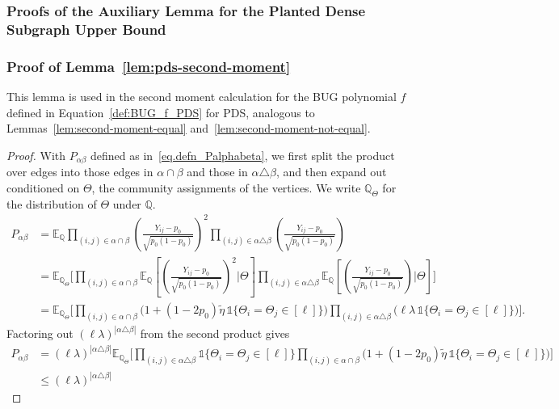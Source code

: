 \documentclass[11pt, letterpaper]{article}
\numberwithin{equation}{section}
\newcommand{\E}{\mathbb{E}}
\newcommand{\QQ}{\mathbb{Q}}
\begin{document}
\subsubsection*{Proofs of the Auxiliary Lemma for the Planted Dense Subgraph Upper Bound}
\subsubsection{Proof of Lemma~\ref{lem:pds-second-moment}}\label{sec:proof:lem:pds-second-moment}
This lemma is used in the second moment calculation for the BUG polynomial $f$ defined in Equation~\eqref{def:BUG_f_PDS} for PDS, analogous to Lemmas~\ref{lem:second-moment-equal} and~\ref{lem:second-moment-not-equal}.
\begin{proof}
    With $P_{\alpha\beta}$ defined as in~\eqref{eq.defn_Palphabeta}, we first split the product over edges into those edges in $\alpha \cap \beta$ and those in $\alpha \triangle \beta$, and then expand out conditioned on $\Theta$, the community assignments of the vertices. We write $\QQ_\Theta$ for the distribution of $\Theta$ under $\QQ$.
    \begin{align*}
        P_{\alpha \beta}&=\E_\QQ \prod_{(i,j)\in\alpha \cap \beta}\left(\frac{Y_{ij}-p_0}{\sqrt{p_0(1-p_0)}}\right)^2 \prod_{(i,j)\in \alpha \triangle \beta}\left(\frac{Y_{ij}-p_0}{\sqrt{p_0(1-p_0)}}\right)\\
        &=\mathbb{E}_{ \QQ_\Theta}\Bigg[
\prod_{(i,j)\in\alpha\cap\beta}
\mathbb{E}_\QQ\left[\left(\frac{Y_{ij}-p_0}{\sqrt{p_0(1-p_0)}}\right)^2\Bigg| \Theta \right] 
\prod_{(i,j)\in\alpha\triangle\beta}
\mathbb{E}_\QQ\left[\left(\frac{Y_{ij}-p_0}{\sqrt{p_0(1-p_0)}}\right)\Bigg|\Theta
\right] 
\Bigg]
\\
&=\mathbb{E}_{ \QQ_\Theta}\Bigg[
\prod_{(i,j)\in\alpha\cap\beta}\Big(1+(1-2p_0)\tilde\eta\,\mathds{1}\{\Theta_i=\Theta_j\in[\ell]\}\Big)
\prod_{(i,j)\in\alpha\triangle\beta}\Big(\ell\lambda\,\mathds{1}\{\Theta_i=\Theta_j\in[\ell]\}\Big)
\Bigg].
\end{align*}
%
Factoring out $(\ell\lambda)^{|\alpha\triangle\beta|}$ from the second product gives
\begin{align*}
P_{\alpha\beta}
&=(\ell\lambda)^{|\alpha\triangle\beta|}
\mathbb{E}_{ \QQ_\Theta}\!\Bigg[
\prod_{(i,j)\in\alpha\triangle\beta} \!\!\! \mathds{1}\{\Theta_i=\Theta_j\in[\ell]\} \!\!
\prod_{(i,j)\in\alpha\cap\beta}\!\!\!\Big(1+(1-2p_0)\tilde\eta\,\mathds{1}\{\Theta_i=\Theta_j\in[\ell]\}\Big)\!
\Bigg]\\
&\le
(\ell\lambda)^{|\alpha\triangle\beta|}

\end{align*}
\end{proof}
\end{document}
